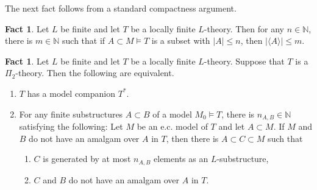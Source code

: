 \documentclass[11pt,reqno]{article}
\theoremstyle{definition}
\newtheorem{fact}[theorem]{Fact}
\theoremstyle{remark}
\begin{document}
The next fact follows from a standard compactness argument.
\begin{fact}
    Let $L$ be finite and let $T$ be a locally finite $L$-theory.
    Then for any $n\in\mathbb N$, there is $m\in\mathbb N$ such that if $A\subset M\models T$ is a subset with $|A|\leq n$, then $|\langle A\rangle| \leq m$.
\end{fact}

\begin{fact}\label{fact:locally finiteness and model companion}
    Let $L$ be finite and let $T$ be a locally finite $L$-theory.
    Suppose that $T$ is a $\Pi_2$-theory.
    Then the following are equivalent.
    \begin{enumerate}
        \item $T$ has a model companion $T^*$.
        \item For any finite substructures $A\subset B$ of a model $M_0\models T$, there is $n_{A,B}\in \mathbb N$ satisfying the following: 
        Let $M$ be an e.c. model of $T$ and let $A\subset M$. 
        If $M$ and $B$ do not have an amalgam over $A$ in $T$, then there is $A\subset C\subset M$ such that
        \begin{enumerate}
            \item $C$ is generated by at most $n_{A,B}$ elements as an $L$-substructure,
            \item $C$ and $B$ do not have an amalgam over $A$ in $T$.
        \end{enumerate}   
    \end{enumerate}
\end{fact}
\end{document}

